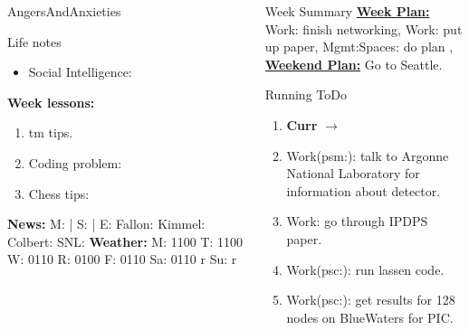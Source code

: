 \begin{columns}
\begin{column}{0.20\linewidth}
\begin{block}{AngersAndAnxieties}
\begin{itemize}
      \end{itemize}
    \end{block}
      \begin{block}{Life notes}
        \begin{itemize}
          \tiny \item \tiny Social Intelligence: 
        \end{itemize}
      \end{block}
      \begin{block}
        {\tiny {\bf Week lessons:}}
        \begin{enumerate}
        \item \tiny tm tips.
        \item \tiny Coding problem: 
        \item \tiny Chess tips: 
        \end{enumerate}
            {{\tiny {\tiny \bf  News:}} {\tiny  M:  | S: 
                | E: Fallon:  Kimmel:  Colbert: SNL:}}
            {{\tiny {\tiny \bf  Weather:}} {\tiny M: 1100 T: 1100 W:
                0110 R: 0100 F: 0110 Sa: 0110 r Su: r }} 

      \end{block}
  \end{column}
  \begin{column}{0.6\linewidth}
    \begin{block}{Week Summary} 
      {\underline {\bf Week Plan:} Work: finish networking, Work: put
        up paper, Mgmt:Spaces: do plan , 
      }\\
      {\underline{\bf Weekend Plan:} Go to Seattle. } \\

    \end{block}
    \begin{block}{Running ToDo} %

\begin{enumerate}
    \item \tiny \textbf{Curr} $\rightarrow$ 
    \item \tiny Work(psm:): talk to Argonne National Laboratory for
      information about detector.

  \item \tiny Work: go through IPDPS paper.  
  \item \tiny Work(psc:): run lassen code. 
  \item \tiny Work(psc:): get results for 128 nodes on BlueWaters for PIC.


\end{enumerate}
\end{block}
\end{column}
\end{columns}
